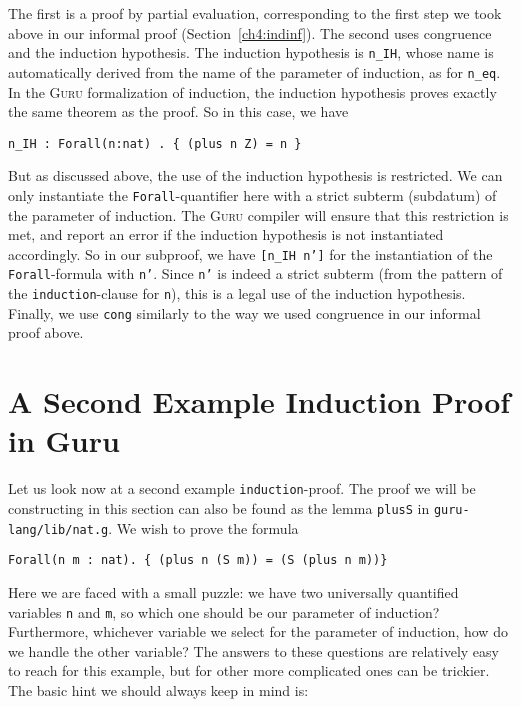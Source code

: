 \documentclass{book}[12pt]
\newcommand{\guru}[0]{\textsc{Guru}\xspace}
\begin{document}
\noindent The first is a proof by partial evaluation, corresponding to
the first step we took above in our informal proof
(Section~\ref{ch4:indinf}).  The second uses congruence and the
induction hypothesis.  The induction hypothesis is \texttt{n\_IH},
whose name is automatically derived from the name of the parameter of
induction, as for \texttt{n\_eq}.  In the \guru formalization of induction,
the induction hypothesis proves exactly the same theorem as the proof.
So in this case, we have

\begin{verbatim}
n_IH : Forall(n:nat) . { (plus n Z) = n }
\end{verbatim}

\noindent But as discussed above, the use of the induction hypothesis
is restricted.  We can only instantiate the \texttt{Forall}-quantifier
here with a strict subterm (subdatum) of the parameter of induction.
The \guru compiler will ensure that this restriction is met, and
report an error if the induction hypothesis is not instantiated
accordingly.  So in our subproof, we have \texttt{[n\_IH n']} for the
instantiation of the \texttt{Forall}-formula with \texttt{n'}.  Since
\texttt{n'} is indeed a strict subterm (from the pattern of the
\texttt{induction}-clause for \texttt{n}), this is a legal use of the
induction hypothesis.  Finally, we use \texttt{cong} similarly to the
way we used congruence in our informal proof above.

\section{A Second Example Induction Proof in Guru}

Let us look now at a second example \texttt{induction}-proof.  The
proof we will be constructing in this section can also be found as the
lemma \texttt{plusS} in \texttt{guru-lang/lib/nat.g}.  We wish to
prove the formula

\begin{verbatim}
Forall(n m : nat). { (plus n (S m)) = (S (plus n m))}
\end{verbatim}

\noindent Here we are faced with a small puzzle: we have two universally
quantified variables \texttt{n} and \texttt{m}, so which one should be
our parameter of induction?  Furthermore, whichever variable we select
for the parameter of induction, how do we handle the other variable?
The answers to these questions are relatively easy to reach for this
example, but for other more complicated ones can be trickier.  The
basic hint we should always keep in mind is:
\end{document}
